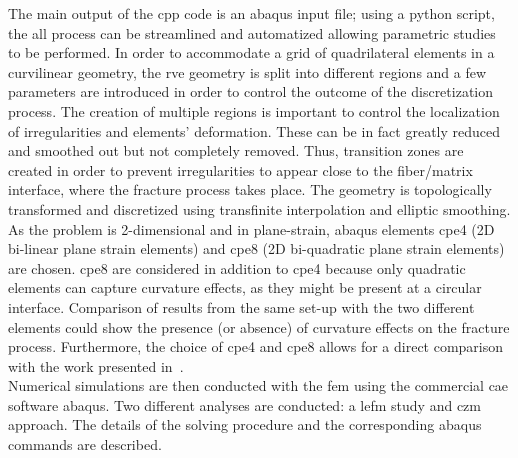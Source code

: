 \documentclass[a4paper, twoside,12pt, abstract]{scrartcl} %
\begin{document}
The main output of the \gls{cpp} code is an \gls{abaqus} input file; using a \gls{python} script, the all process can be streamlined and automatized allowing parametric studies to be performed. In order to accommodate a grid of quadrilateral elements in a curvilinear geometry, the \acrshort{rve} geometry is split into different regions and a few parameters are introduced in order to control the outcome of the discretization process. The creation of multiple regions is important to control the localization of irregularities and elements' deformation. These can be in fact greatly reduced and smoothed out but not completely removed. Thus, transition zones are created in order to prevent irregularities to appear close to the fiber/matrix interface, where the fracture process takes place. The geometry is topologically transformed and discretized using transfinite interpolation and elliptic smoothing.\\
As the problem is 2-dimensional and in plane-strain, \gls{abaqus} elements \gls{cpe4} (2D bi-linear plane strain elements) and \gls{cpe8} (2D bi-quadratic plane strain elements) are chosen. \gls{cpe8} are considered in addition to  \gls{cpe4} because only quadratic elements can capture curvature effects, as they might be present at a circular interface. Comparison of results from the same set-up with the two different elements could show the presence (or absence) of curvature effects on the fracture process. Furthermore, the choice of \gls{cpe4} and \gls{cpe8} allows for a direct comparison with the work presented in~\cite{Herraez2015196}.\\
Numerical simulations are then conducted with the \acrfull{fem} using the commercial \acrshort{cae} software \gls{abaqus}. Two different analyses are conducted: a \acrfull{lefm} study and \acrfull{czm} approach. The details of the solving procedure and the corresponding \gls{abaqus} commands are described.



\setcounter{page}{1}

\end{document}
